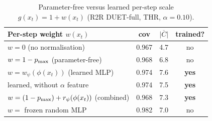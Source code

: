 \begin{table}[!ht]
\centering
\caption{Parameter-free versus learned per-step scale $g(x_t)=1+w(x_t)$ (R2R
DUET-full, THR, $\alpha=0.10$).}
\label{tab:learned}
\setlength{\tabcolsep}{4pt}\footnotesize
\begin{tabular}{lccc}
\toprule
Per-step weight $w(x_t)$ & cov & $\overline{|C|}$ & trained? \\
\midrule
$w=0$ (no normalisation)              & 0.967 & 4.7 & no \\
$w=1-p_{\max}$ (parameter-free)          & 0.968 & 6.8 & no \\
$w=w_\psi(\phi(x_t))$ (learned MLP)   & 0.974 & 7.6 & \textbf{yes} \\
\quad learned, without $\alpha$ feature & 0.974 & 7.5 & \textbf{yes} \\
$w=(1-p_{\max})+r_\psi(\phi(x_t))$ (combined) & 0.968 & 7.3 & \textbf{yes} \\
$w=$ frozen random MLP                & 0.982 & 7.0 & no \\
\bottomrule
\end{tabular}
\end{table}
